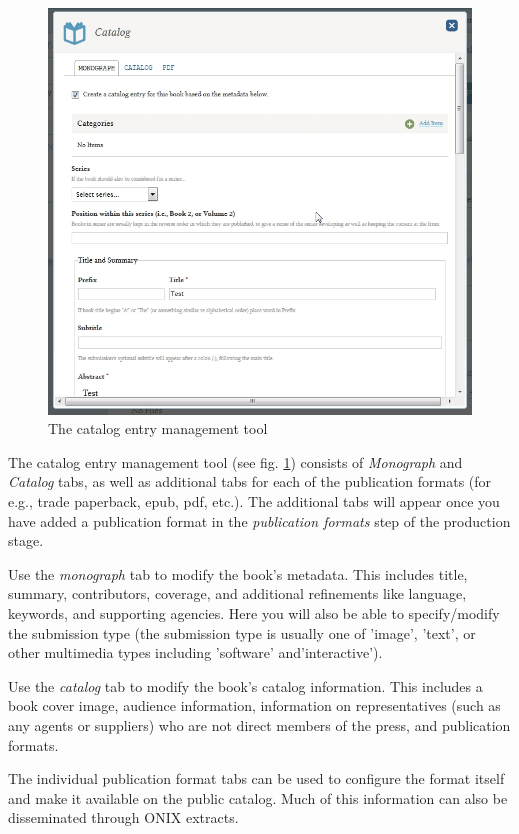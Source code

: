 \begin{figure}[h] \centering
\includegraphics[width=1\textwidth]{./img/metadata.jpg} \caption{The catalog entry management tool}
\label{fig:metadata}
\end{figure}

The catalog entry management tool (see fig. \ref{fig:metadata}) consists of \textit{Monograph} and \textit{Catalog} tabs, as well as additional tabs for each of the publication formats (for e.g., trade paperback, epub, pdf, etc.). The additional tabs will appear once you have added a publication format in the \textit{publication formats} step of the production stage. 

Use the \textit{monograph} tab to modify the book's metadata. This includes title, summary, contributors, coverage, and additional refinements like language, keywords, and supporting agencies. Here you will also be able to specify/modify the submission type (the submission type is usually one of 'image', 'text', or other multimedia types including 'software' and'interactive').

Use the \textit{catalog} tab to modify the book's catalog information. This includes a book cover image, audience information, information on representatives (such as any agents or suppliers) who are not direct members of the press, and publication formats. 

The individual publication format tabs can be used to configure the format itself and make it available on the public catalog. Much of this information can also be disseminated through ONIX extracts.

